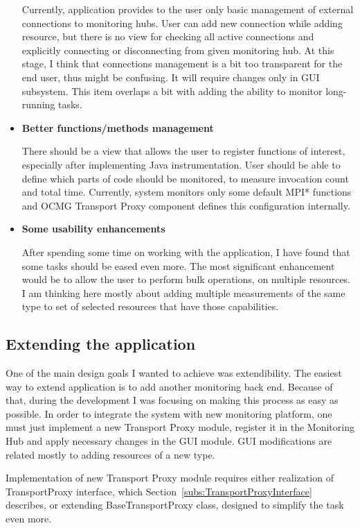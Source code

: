 \begin{itemize}
Currently, application provides to the user only basic management of external connections to monitoring hubs. User can add new connection while adding resource, but there is no view for checking all active connections and explicitly connecting or disconnecting from given monitoring hub. At this stage, I think that connections management is a bit too transparent for the end user, thus might be confusing. It will require changes only in GUI subsystem. This item overlaps a bit with adding the ability to monitor long-running tasks.

\item{\bf Better functions/methods management}

There should be a view that allows the user to register functions of interest, especially after implementing Java instrumentation. User should be able to define which parts of code should be monitored, to measure invocation count and total time. Currently, system monitors only some default MPI* functions and OCMG Transport Proxy component defines this configuration internally.

\item {\bf Some usability enhancements}

After spending some time on working with the application, I have found that some tasks should be eased even more. The most significant enhancement would be to allow the user to perform bulk operations, on multiple resources. I am thinking here mostly about adding multiple measurements of the same type to set of selected resources that have those capabilities.

\end{itemize}

\subsection{Extending the application}

One of the main design goals I wanted to achieve was extendibility. The easiest way to extend application is to add another monitoring back end. Because of that, during the development I was focusing on making this process as easy as possible. In order to integrate the system with new monitoring platform, one must just implement a new Transport Proxy module, register it in the Monitoring Hub and apply necessary changes in the GUI module. GUI modifications are related mostly to adding resources of a new type.

Implementation of new Transport Proxy module requires either realization of TransportProxy interface, which Section~\ref{subs:TransportProxyInterface} describes, or extending BaseTransportProxy class, designed to simplify the task even more.

